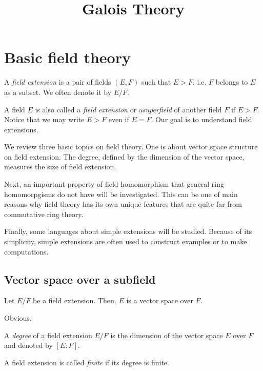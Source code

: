 \documentclass{../exp}
\title{Galois Theory}
\begin{document}
\maketitle
\tableofcontents








\section{Basic field theory}
\begin{defn}
A \emph{field extension} is a pair of fields $(E,F)$ such that $E>F$, i.e. $F$ belongs to $E$ as a subset.
We often denote it by $E/F$.
\end{defn}
A field $E$ is also called a \emph{field extension} or a\emph{superfield} of another field $F$ if $E>F$.
Notice that we may write $E>F$ even if $E=F$.
Our goal is to understand field extensions.

We review three basic topics on field theory.
One is about vector space structure on field extension.
The degree, defined by the dimension of the vector space, measures the size of field extension.

Next, an important property of field homomorphism that general ring homomorpgisms do not have will be investigated.
This can be one of main reasons why field theory has its own unique features that are quite far from commutative ring theory.

Finally, some languages about simple extensions will be studied.
Because of its simplicity, simple extensions are often used to construct examples or to make computations.

\subsection{Vector space over a subfield}

\begin{thm}
Let $E/F$ be a field extension.
Then, $E$ is a vector space over $F$.
\end{thm}
\begin{pf}
Obvious.
\end{pf}

\begin{defn}
A \emph{degree} of a field extension $E/F$ is the dimension of the vector space $E$ over $F$ and denoted by $[E:F]$.
\end{defn}

\begin{defn}
A field extension is called \emph{finite} if its degree is finite.
\end{defn}
\end{document}
